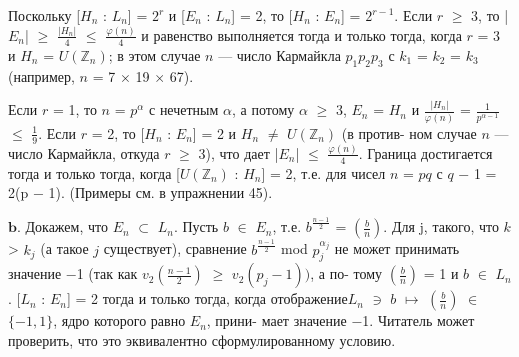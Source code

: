 \vspace{4pt}Поскольку [$H_{n}$ : $L_{n}$] = $2^{r}$ и [$E_{n}$ : $L_{n}$] = 2, то [$H_{n}$ : $E_{n}$] = $2^{r-1}$. Если \linebreak
$r$ $\geqslant$ 3, то |$E_{n}$| $\geqslant$  $\frac{|H_{n}|}{4}$ $\leqslant$ $\frac{\varphi(n)}{4}$ и равенство выполняется тогда и только \linebreak
тогда, когда $r$ = 3 и $H_{n}$ = $U(\mathbb Z_n)$; в этом случае $n$ --- число Кармайкла \linebreak
$p_{1}p_{2}p_{3}$ с $k_{1}$ = $k_{2}$ = $k_{3}$ (например, $n$ = 7 $\times$ 19 $\times$ 67). \ 

\vspace{4pt}Если $r$ = 1, то $n$ = $p^{\alpha}$ с нечетным $\alpha$, а потому $\alpha$ $\geqslant$ 3, $E_{n}$ = $H_{n}$ и \linebreak
$\frac{|H_{n}|}{\varphi(n)}$ = $\frac{1}{p^{\alpha-1}}$ $\leqslant$ $\frac{1}{9}$. Если $r$ = 2, то [$H_{n}$ : $E_{n}$] = 2 и $H_{n}$ $\ne$ $U(\mathbb Z_n)$ (в против- \linebreak
ном случае $n$ --- число Кармайкла, откуда $r$ $\geqslant$ 3), что дает |$E_{n}$| $\leqslant$ $\frac{\varphi(n)}{4}$. \linebreak
Граница достигается тогда и только тогда, когда [$U(\mathbb Z_n)$ : $H_{n}$] = 2, т.е.
для чисел $n$ = $pq$ с $q$ $-$ 1 = 2(p $-$ 1). (Примеры см. в упражнении 45). \ 

\vspace{3pt}$\mathbf{b.}$ Докажем, что $E_{n}$ $\subset$ $L_{n}$.  Пусть $b$ $\in$ $E_{n}$, т.е. $b^{\frac{n-1}{2}}$ = $\left(\frac{b}{n} \right)$. Для j, \linebreak
такого, что $k$ > $k_{j}$ (а такое $j$ существует), сравнение $b^{\frac{n-1}{2}}$ mod $p_{j}^{\alpha_{j}}$ не \linebreak
может принимать значение $-$1 (так как $v_{2}(\frac{n-1}{2})$ $\geqslant$ $v_{2}(p_{j} - 1))$, а по­- \linebreak
тому $\left(\frac{b}{n} \right)$ = 1 и $b$ $\in$ $L_{n}$. [$L_{n}$ : $E_{n}$] = 2 тогда и только тогда, когда \linebreak
отображение$L_{n}$ $\ni$ $b$ $\mapsto$ $\left(\frac{b}{n} \right)$ $\in$ $\{-1, 1\}$, ядро которого равно $E_{n}$, прини­- \linebreak
мает значение $-$1. Читатель может проверить, что это эквивалентно \linebreak
сформулированному условию. \ 

